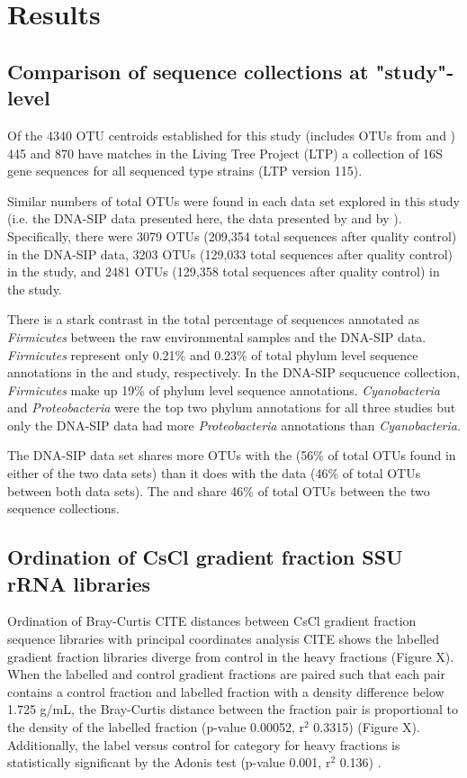\section{Results}

\subsection{Comparison of sequence collections at "study"-level}
Of the 4340 OTU centroids established for this study (includes OTUs from \citet{Steven_2013} and \cite{Garcia_Pichel_2013}) 445 and 870 have matches in the Living Tree Project (LTP) a collection of 16S gene sequences for all sequenced type strains \cite{Yarza_2008} (LTP version 115).

Similar numbers of total OTUs were found in each data set explored in this study (i.e. the DNA-SIP data presented here, the data presented by \citet{Steven_2013} and by \citet{Garcia_Pichel_2013}). Specifically, there were 3079 OTUs (209,354 total sequences after quality control) in the DNA-SIP data, 3203 OTUs (129,033 total sequences after quality control) in the \citet{Garcia_Pichel_2013} study, and 2481 OTUs (129,358 total sequences after quality control) in the \citet{Steven_2013} study.

There is a stark contrast in the total percentage of sequences annotated as \textit{Firmicutes} between the raw environmental samples and the DNA-SIP data. \textit{Firmicutes} represent only 0.21\% and 0.23\% of total phylum level sequence annotations in the \citet{Steven_2013} and \citet{Garcia_Pichel_2013} study, respectively. In the DNA-SIP sequcuence collection, \textit{Firmicutes} make up 19\% of phylum level sequence annotations. \textit{Cyanobacteria} and \textit{Proteobacteria} were the top two phylum annotations for all three studies but only the DNA-SIP data had more \textit{Proteobacteria} annotations than \textit{Cyanobacteria}.

The DNA-SIP data set shares more OTUs with the \citet{Steven_2013} (56\% of total OTUs found in either of the two data sets) than it does with the \citet{Garcia_Pichel_2013} data (46\% of total OTUs between both data sets). The \cite{Steven_2013} and \cite{Garcia_Pichel_2013} share 46\% of total OTUs between the two sequence collections.

\subsection{Ordination of CsCl gradient fraction SSU rRNA libraries}
Ordination of Bray-Curtis CITE distances between CsCl gradient fraction sequence libraries with principal coordinates analysis CITE shows the labelled gradient fraction libraries diverge from control in the heavy fractions (Figure X). When the labelled and control gradient fractions are paired such that each pair contains a control fraction and labelled fraction with a density difference below 1.725 g/mL, the Bray-Curtis distance between the fraction pair is proportional to the density of the labelled fraction (p-value 0.00052, r$^{2}$ 0.3315) (Figure X). Additionally, the label versus control for category for heavy fractions is statistically significant by the Adonis test (p-value 0.001, r$^{2}$ 0.136) \cite{Anderson_2001}.

